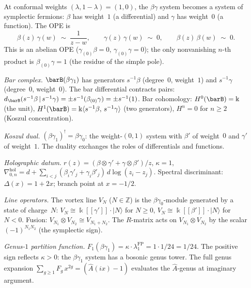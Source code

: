 \begin{computation}[$\beta\gamma$ at $\lambda=1$: symplectic
fermions as a holographic system; \ClaimStatusProvedHere]
\label{comp:symplectic-fermion-holographic}
At conformal weights $(\lambda,1{-}\lambda)=(1,0)$, the
$\beta\gamma$ system becomes a system of symplectic fermions:
$\beta$ has weight~$1$ (a differential) and $\gamma$ has
weight~$0$ (a function). The OPE is
\[
\beta(z)\,\gamma(w)\;\sim\;\frac{1}{z-w},
\qquad
\gamma(z)\,\gamma(w)\;\sim\;0,
\qquad
\beta(z)\,\beta(w)\;\sim\;0.
\]
This is an abelian OPE ($\gamma_{(0)}\beta=0$,
$\gamma_{(0)}\gamma=0$); the only nonvanishing $n$-th product
is $\beta_{(0)}\gamma=1$ (the residue of the simple pole).

\emph{Bar complex.}
$\barB(\beta\gamma_1)$ has generators $s^{-1}\beta$ (degree~$0$,
weight~$1$) and $s^{-1}\gamma$ (degree~$0$, weight~$0$).
The bar differential contracts pairs:
$d_{\barB}(s^{-1}\beta\,|\,s^{-1}\gamma)
=\pm s^{-1}(\beta_{(0)}\gamma)=\pm s^{-1}(1)$.
Bar cohomology: $H^0(\barB)=\Bbbk$ (the unit),
$H^1(\barB)=\Bbbk\langle s^{-1}\beta,\,s^{-1}\gamma\rangle$
(two generators), $H^n=0$ for $n\ge 2$ (Koszul concentration).

\emph{Koszul dual.}
$(\beta\gamma_1)^!=\beta\gamma_0$: the weight-$(0,1)$ system
with $\beta'$ of weight~$0$ and $\gamma'$ of weight~$1$.
The duality exchanges the roles of differentials and functions.

\emph{Holographic datum.}
$r(z)=(\beta\otimes\gamma'+\gamma\otimes\beta')/z$,
$\kappa=1$,
$\nabla^{\mathrm{hol}}_{0,n}
=d+\sum_{i<j}
(\beta_i\gamma'_j+\gamma_i\beta'_j)\,d\log(z_i-z_j)$.
Spectral discriminant: $\Delta(x)=1+2x$; branch point at
$x=-1/2$.

\emph{Line operators.}
The vortex line $V_N$ ($N\in\mathbb Z$) is the
$\beta\gamma_0$-module generated by a state of charge~$N$:
$V_N\cong\Bbbk[[\gamma']]\cdot|N\rangle$ for $N\ge 0$,
$V_N\cong\Bbbk[[\beta']]\cdot|N\rangle$ for $N<0$.
Fusion: $V_{N_1}\otimes V_{N_2}\cong V_{N_1+N_2}$.
The $R$-matrix acts on $V_{N_1}\otimes V_{N_2}$ by the scalar
$(-1)^{N_1 N_2}$ (the symplectic sign).

\emph{Genus-$1$ partition function.}
$F_1(\beta\gamma_1)=\kappa \cdot \lambda_1^{\mathrm{FP}} = 1 \cdot 1/24=1/24$.
The positive sign reflects $\kappa>0$: the $\beta\gamma_1$ system has
a bosonic genus tower. The full genus expansion
$\sum_{g\ge 1}F_g\,x^{2g}=(\hat A(ix)-1)$
evaluates the $\hat A$-genus at imaginary argument.
\end{computation}

